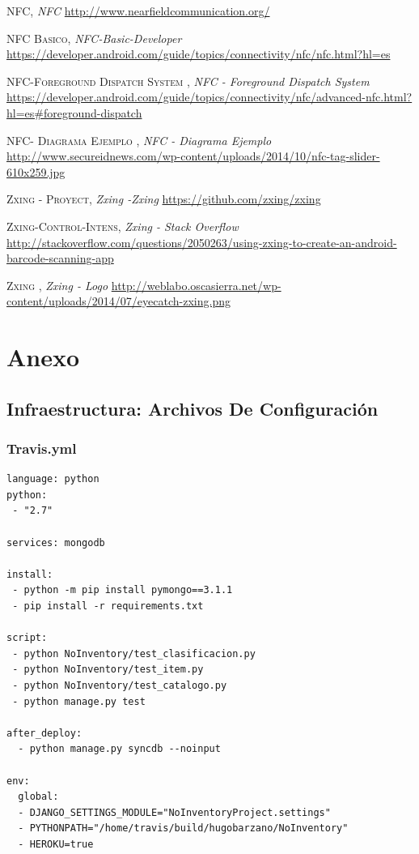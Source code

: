 \documentclass[a4paper,11pt]{book}
\begin{document}
\begin{thebibliography}{aaaa}
 \textsc{NFC},
\textit{NFC}
\url{http://www.nearfieldcommunication.org/}

 \textsc{NFC Basico},
\textit{NFC-Basic-Developer}
\url{https://developer.android.com/guide/topics/connectivity/nfc/nfc.html?hl=es}

 \textsc{ NFC-Foreground Dispatch System },
\textit{NFC -  Foreground Dispatch System}
\url{https://developer.android.com/guide/topics/connectivity/nfc/advanced-nfc.html?hl=es#foreground-dispatch}


 \textsc{ NFC- Diagrama Ejemplo },
\textit{NFC -  Diagrama Ejemplo}
\url{http://www.secureidnews.com/wp-content/uploads/2014/10/nfc-tag-slider-610x259.jpg}

 \textsc{ Zxing - Proyect},
\textit{Zxing -Zxing}
\url{https://github.com/zxing/zxing}

 \textsc{ Zxing-Control-Intens},
\textit{Zxing - Stack Overflow}
\url{http://stackoverflow.com/questions/2050263/using-zxing-to-create-an-android-barcode-scanning-app}


 \textsc{ Zxing },
\textit{Zxing - Logo}
\url{http://weblabo.oscasierra.net/wp-content/uploads/2014/07/eyecatch-zxing.png}

\end{thebibliography}
 

\chapter{Anexo}
\section{Infraestructura: Archivos De Configuración}
\subsection{Travis.yml}\label{sec:travis}
\begin{lstlisting}
language: python
python:
 - "2.7"

services: mongodb

install:
 - python -m pip install pymongo==3.1.1
 - pip install -r requirements.txt

script:
 - python NoInventory/test_clasificacion.py
 - python NoInventory/test_item.py
 - python NoInventory/test_catalogo.py
 - python manage.py test
 
after_deploy:
  - python manage.py syncdb --noinput

env:
  global:
  - DJANGO_SETTINGS_MODULE="NoInventoryProject.settings"
  - PYTHONPATH="/home/travis/build/hugobarzano/NoInventory"
  - HEROKU=true

\end{lstlisting}
\end{document}
